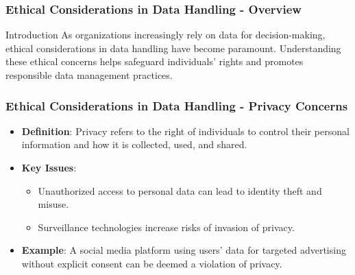 \documentclass[aspectratio=169]{beamer}
\begin{document}
\begin{frame}[fragile]
    \frametitle{Ethical Considerations in Data Handling - Overview}
    \begin{block}{Introduction}
        As organizations increasingly rely on data for decision-making, ethical considerations in data handling have become paramount. Understanding these ethical concerns helps safeguard individuals' rights and promotes responsible data management practices.
    \end{block}
\end{frame}

\begin{frame}[fragile]
    \frametitle{Ethical Considerations in Data Handling - Privacy Concerns}
    \begin{itemize}
        \item \textbf{Definition}: Privacy refers to the right of individuals to control their personal information and how it is collected, used, and shared.
        \item \textbf{Key Issues}:
            \begin{itemize}
                \item Unauthorized access to personal data can lead to identity theft and misuse.
                \item Surveillance technologies increase risks of invasion of privacy.
            \end{itemize}
        \item \textbf{Example}: A social media platform using users' data for targeted advertising without explicit consent can be deemed a violation of privacy.
    \end{itemize}
\end{frame}
\end{document}
